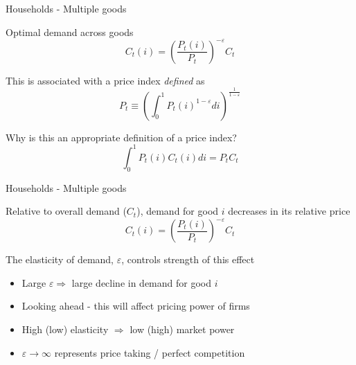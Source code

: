 \documentclass{beamer}
\begin{document}

	
\begin{frame}{Households - Multiple goods}

Optimal demand across goods
\begin{equation*}
C_{t}(i) = \left( \frac{P_{t}(i)}{P_{t}} \right)^{-\varepsilon} C_{t}
\end{equation*}

This is associated with a price index \emph{defined} as
\begin{equation*}
P_{t} \equiv \left( \int_{0}^{1} P_{t}(i)^{1-\varepsilon}di \right)^{\frac{1}{1-\varepsilon}} \label{eqn:ds_optimal_cons_pindex}
\end{equation*}

Why is this an appropriate definition of a price index?
\begin{equation*}
\int_{0}^{1} P_{t}(i) C_{t}(i) di = P_{t} C_{t} \label{eqn:pc_expenditure}
\end{equation*}


\end{frame}


	
\begin{frame}{Households - Multiple goods}

Relative to overall demand ($C_{t}$), demand for good $i$ decreases in its relative price
\[
C_{t}(i) = \left( \frac{P_{t}(i)}{P_{t}} \right)^{-\varepsilon} C_{t}
\]

\vspace{3mm}
The elasticity of demand,  $\varepsilon$, controls strength of this effect
\begin{itemize}
\item	Large $\varepsilon \Rightarrow$ large decline in demand for good $i$
\item	Looking ahead - this will affect pricing power of firms
\item	High (low) elasticity $\Rightarrow$ low (high) market power
\item	$\varepsilon \rightarrow \infty$ represents price taking / perfect competition
\end{itemize}

\end{frame}
\end{document}
